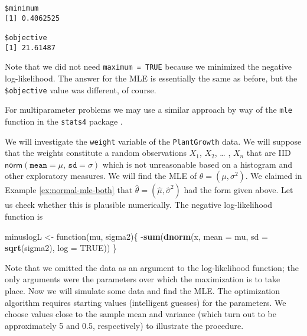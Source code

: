 \documentclass[]{book}
\newenvironment{Shaded}{\begin{snugshade}}{\end{snugshade}}
\newcommand{\KeywordTok}[1]{\textcolor[rgb]{0.13,0.29,0.53}{\textbf{{#1}}}}
\newcommand{\DataTypeTok}[1]{\textcolor[rgb]{0.13,0.29,0.53}{{#1}}}
\newcommand{\StringTok}[1]{\textcolor[rgb]{0.31,0.60,0.02}{{#1}}}
\newcommand{\OtherTok}[1]{\textcolor[rgb]{0.56,0.35,0.01}{{#1}}}
\newcommand{\NormalTok}[1]{{#1}}
\numberwithin{equation}{chapter}
\numberwithin{figure}{chapter}
\theoremstyle{plain}
\theoremstyle{definition}
\theoremstyle{remark}
\theoremstyle{definition}
\theoremstyle{definition}
\theoremstyle{remark}
\let\BeginKnitrBlock\begin \let\EndKnitrBlock\end
\begin{document}
\begin{verbatim}
$minimum
[1] 0.4062525

$objective
[1] 21.61487
\end{verbatim}

Note that we did not need \texttt{maximum\ =\ TRUE} because we minimized
the negative log-likelihood. The answer for the MLE is essentially the
same as before, but the \texttt{\$objective} value was different, of
course.

For multiparameter problems we may use a similar approach by way of the
\texttt{mle} function in the \texttt{stats4} package \autocite{stats4}.

\bigskip

\BeginKnitrBlock{example}[Plant Growth]
\protect\hypertarget{ex:unnamed-chunk-386}{}{\label{ex:unnamed-chunk-386}
\iffalse (Plant Growth) \fi }We will investigate the \texttt{weight}
variable of the \texttt{PlantGrowth} data. We will suppose that the
weights constitute a random observations \(X_{1}\), \(X_{2}\), \ldots{}
, \(X_{n}\) that are IID
\(\mathsf{norm}(\mathtt{mean}=\mu,\,\mathtt{sd}=\sigma)\) which is not
unreasonable based on a histogram and other exploratory measures. We
will find the MLE of \(\theta=(\mu,\sigma^{2})\). We claimed in Example
\ref{ex:normal-mle-both} that
\(\hat{\theta}=(\hat{\mu},\hat{\sigma}^{2})\) had the form given above.
Let us check whether this is plausible numerically. The negative
log-likelihood function is
\EndKnitrBlock{example}

\begin{Shaded}
\begin{Highlighting}[]
\NormalTok{minuslogL <-}\StringTok{ }\NormalTok{function(mu, sigma2)\{}
  \NormalTok{-}\KeywordTok{sum}\NormalTok{(}\KeywordTok{dnorm}\NormalTok{(x, }\DataTypeTok{mean =} \NormalTok{mu, }\DataTypeTok{sd =} \KeywordTok{sqrt}\NormalTok{(sigma2), }\DataTypeTok{log =} \OtherTok{TRUE}\NormalTok{))}
\NormalTok{\}}
\end{Highlighting}
\end{Shaded}

Note that we omitted the data as an argument to the log-likelihood
function; the only arguments were the parameters over which the
maximization is to take place. Now we will simulate some data and find
the MLE. The optimization algorithm requires starting values
(intelligent guesses) for the parameters. We choose values close to the
sample mean and variance (which turn out to be approximately 5 and 0.5,
respectively) to illustrate the procedure.
\end{document}
